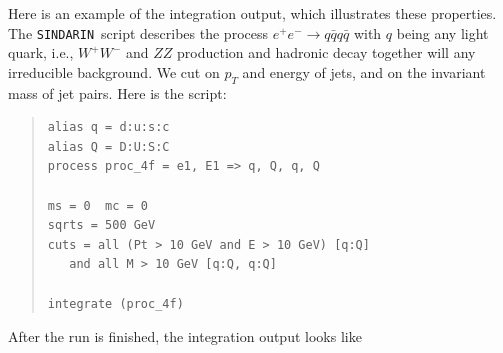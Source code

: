 \documentclass[12pt]{book}
\newcommand{\ttt}[1]{\texttt{#1}}
\newcommand{\sindarin}{\ttt{SINDARIN}}
\begin{document}
Here is an example of the integration output, which illustrates these
properties.  The \sindarin\ script describes the process $e^+e^-\to q\bar q
q\bar q$ with $q$ being any light quark, i.e., $W^+W^-$ and $ZZ$ production
and hadronic decay together will any irreducible background.  We cut on $p_T$
and energy of jets, and on the invariant mass of jet pairs.  Here is the
script:
\begin{quote}
\begin{footnotesize}
\begin{verbatim}
alias q = d:u:s:c
alias Q = D:U:S:C
process proc_4f = e1, E1 => q, Q, q, Q

ms = 0  mc = 0
sqrts = 500 GeV
cuts = all (Pt > 10 GeV and E > 10 GeV) [q:Q]
   and all M > 10 GeV [q:Q, q:Q]

integrate (proc_4f)
\end{verbatim}
\end{footnotesize}
\end{quote}
After the run is finished, the integration output looks like
\end{document}
